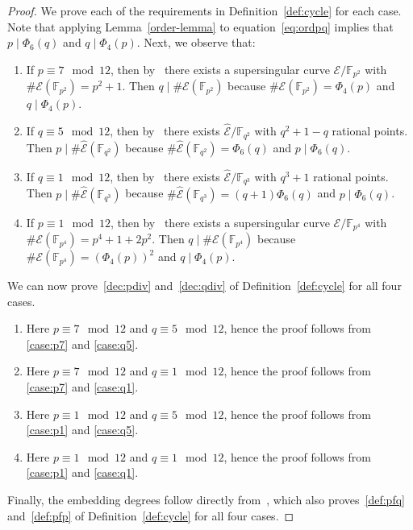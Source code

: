 \documentclass[version=preprint]{iacrcc}
\newcommand{\F}{\mathbb{F}}
\newcommand{\EC}{\mathcal{E}}
\begin{document}
\begin{proof}
We prove each of the requirements in Definition~\ref{def:cycle} for each case. Note that applying Lemma~\ref{order-lemma} to equation~\eqref{eq:ordpq} implies that $p\mid \Phi_6(q)$ and $q\mid \Phi_4(p)$. Next, we observe that:
\begin{enumerate}[label = {(\alph*)}]
    \item If $p \equiv 7\mod 12$, then by~\cite[Theorem 4.1(5)(ii)]{waterhouse}  there exists a supersingular curve $\EC/\F_{p^2}$ with $\#\EC(\F_{p^2}) = p^2+1$. Then $q\mid \#\EC(\F_{p^2})$ because $\#\EC(\F_{p^2})=\Phi_4(p)$ and $q \mid \Phi_4(p)$. \label{case:p7}
    \item If $q\equiv 5\mod 12$, then by~\cite[Theorem 4.1(3)]{waterhouse} there exists $\hat{\EC}/\F_{q^2}$ with $q^2+1-q$ rational points. Then $p\mid \#\hat{\EC}(\F_{q^2})$ because $\#\hat{\EC}(\F_{q^2})=\Phi_6(q)$ and $p \mid \Phi_6(q)$. \label{case:q5}
    \item If $q\equiv 1\mod 12$, then by~\cite[Theorem 4.1(5)(i)]{waterhouse} there exists $\hat{\EC}/\F_{q^3}$ with $q^3+1$ rational points. Then $p\mid \#\hat{\EC}(\F_{q^3})$ because $\#\hat{\EC}(\F_{q^3})=(q+1)\Phi_6(q)$ and $p \mid \Phi_6(q)$. \label{case:q1}
    \item If $p \equiv 1\mod 12$, then by~\cite[Theorem 4.1(2)]{waterhouse} there exists a supersingular curve $\EC/\F_{p^4}$ with $\#\EC(\F_{p^4}) = p^4+1+2p^2$. Then $q\mid \#\EC(\F_{p^4})$ because $\#\EC(\F_{p^4})=(\Phi_4(p))^2$ and $q \mid \Phi_4(p)$. \label{case:p1}
\end{enumerate}
We can now prove~\ref{dec:pdiv} and~\ref{dec:qdiv} of Definition~\ref{def:cycle} for all four cases.
\begin{enumerate}
    \item Here $p \equiv 7\mod 12$ and $q\equiv 5\mod 12$, hence the proof follows from \ref{case:p7} and \ref{case:q5}.
    \item Here $p \equiv 7\mod 12$ and $q\equiv 1\mod 12$, hence the proof follows from \ref{case:p7} and \ref{case:q1}.
    \item Here $p \equiv 1\mod 12$ and $q\equiv 5\mod 12$, hence the proof follows from \ref{case:p1} and \ref{case:q5}.
    \item Here $p \equiv 1\mod 12$ and $q\equiv 1\mod 12$, hence the proof follows from \ref{case:p1} and \ref{case:q1}.
\end{enumerate}
Finally, the embedding degrees follow directly from~\cite[Theorem IX.20]{GalbraithBSS}, which also proves~\ref{def:pfq} and~\ref{def:pfp} of Definition~\ref{def:cycle} for all four cases.
\end{proof}
\end{document}
